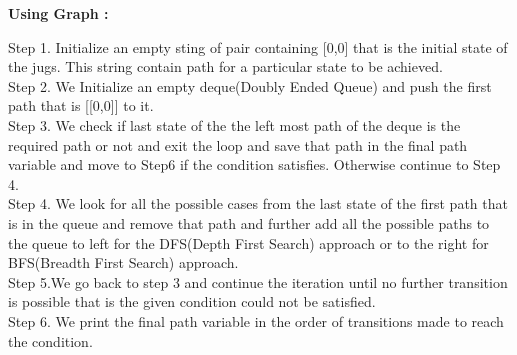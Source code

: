 \documentclass[conference]{IEEEtran}
\begin{document}
  

\textbf{Using Graph :}


Step 1. Initialize an empty sting of pair containing [0,0] that is the initial state of the jugs. This string contain path for a particular state to be achieved. \\

Step 2. We Initialize an empty deque(Doubly Ended Queue) and push the first path that is [[0,0]] to it.  \\

Step 3. We check if last state of the the left most path of the deque is the required path or not and exit the loop and save that path in the final path variable and move to Step6 if the condition satisfies. Otherwise continue to Step 4.\\

Step 4. We look for all the possible cases from the last state of the first path that is in the queue and remove that path and further add all the possible paths to the queue to left for the DFS(Depth First Search) approach or to the right for BFS(Breadth First Search) approach.\\

Step 5.We go back to step 3 and continue the iteration until no further transition is possible that is the given condition could not be satisfied.\\

Step 6. We print the final path variable in the order of transitions made to reach the condition.\\
\end{document}
